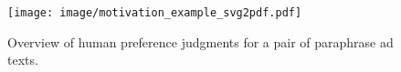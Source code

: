 \begin{figure}[t]
 \centering
  \texttt{[image: image/motivation\_example\_svg2pdf.pdf]}
 \caption{Overview of human preference judgments for a pair of paraphrase ad texts.}
 \label{fig:motivation_example}
\end{figure}